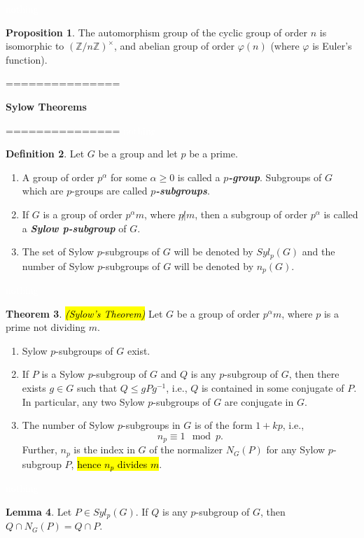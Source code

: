 \documentclass{article}
\theoremstyle{definition}
\newtheorem{thm}{Theorem}[section]
\newtheorem{lem}[thm]{Lemma}
\newtheorem{prop}[thm]{Proposition}
\newtheorem{defn}[thm]{Definition}
\newcommand{\nl}{\textcolor{white}{nothing}}
\newcommand{\inv}{^{-1}}
\newcommand{\Z}{\mathbb{Z}}
\newcommand{\al}{\alpha}
\newcommand{\vphi}{\varphi}
\begin{document}
\nl

\begin{prop}
The automorphism group of the cyclic group of order $n$ is isomorphic to $(\Z/n\Z)^\times$, and abelian group of order $\vphi(n)$  (where $\vphi$ is Euler's function).
\end{prop}

===============

\textbf{Sylow Theorems}

===============
\nl
\begin{defn}
Let $G$ be a group and let $p$ be a prime.
\begin{enumerate}
\item A group of order $p^\al$ for some $\al\geq 0$ is called a $p$\textbf{\textit{-group}}. Subgroups of $G$ which are $p$-groups are called $p$\textbf{\textit{-subgroups}}.
\item If $G$ is a group of order $p^\al m$, where $p\not |m$, then a subgroup of order $p^\al$ is called a \textbf{\textit{Sylow p-subgroup}} of $G$.
\item The set of Sylow $p$-subgroups of $G$ will be denoted by $Syl_p(G)$ and the number of Sylow $p$-subgroups of $G$ will be denoted by $n_p(G)$.
\end{enumerate}
\end{defn}

\nl

\begin{thm}\hl{\textit{(Sylow's Theorem)}}
Let $G$ be a group of order $p^\al m$, where $p$ is a prime not dividing $m$.
\begin{enumerate}
\item Sylow $p$-subgroups of $G$ exist.
\item If $P$ is a Sylow $p$-subgroup of $G$ and $Q$ is any $p$-subgroup of $G$, then there exists $g\in G$ such that $Q\leq gPg\inv$, i.e., $Q$ is contained in some conjugate of $P$. In particular, any two Sylow $p$-subgroups of $G$ are conjugate in $G$.
\item The number of Sylow $p$-subgroups in $G$ is of the form $1+kp$, i.e., 
\[n_p\equiv 1\mod p.\]
Further, $n_p$ is the index in $G$ of the normalizer $N_G(P)$ for any Sylow $p$-subgroup $P$, \hl{hence $n_p$ divides $m$}.
\end{enumerate}
\end{thm}

\nl

\begin{lem}
Let $P\in Syl_p(G)$. If $Q$ is any $p$-subgroup of $G$, then $Q\cap N_G(P)=  Q\cap P$.
\end{lem}
\end{document}
